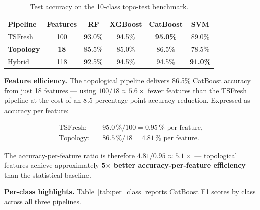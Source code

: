 \documentclass[12pt, a4paper]{article}
\theoremstyle{definition}
\theoremstyle{plain}
\begin{document}
\begin{table}[H]
\centering
\caption{Test accuracy on the 10-class topo-test benchmark.}
\label{tab:results_main}
\begin{tabular}{lccccc}
\toprule
\textbf{Pipeline} & \textbf{Features} & \textbf{RF} & \textbf{XGBoost}
  & \textbf{CatBoost} & \textbf{SVM} \\
\midrule
TSFresh           & 100 & 93.0\% & 94.5\% & \textbf{95.0\%} & 89.0\% \\
\textbf{Topology} & \textbf{18}  & 85.5\% & 85.0\% & 86.5\% & 78.5\% \\
Hybrid            & 118 & 92.5\% & 94.5\% & 94.5\% & \textbf{91.0\%} \\
\bottomrule
\end{tabular}
\end{table}

\noindent
\textbf{Feature efficiency.} The topological pipeline delivers 86.5\% CatBoost
accuracy from just 18 features — using $100/18 \approx 5.6\times$ fewer features
than the TSFresh pipeline at the cost of an 8.5 percentage point accuracy
reduction. Expressed as accuracy per feature:

\begin{align*}
  \text{TSFresh:} &\quad 95.0\,\% / 100 = 0.95\,\% \text{ per feature,} \\
  \text{Topology:} &\quad 86.5\,\% / 18  = 4.81\,\% \text{ per feature.}
\end{align*}

The accuracy-per-feature ratio is therefore
$4.81 / 0.95 \approx 5.1\times$ — topological features achieve
approximately \textbf{5$\times$ better accuracy-per-feature efficiency} than
the statistical baseline.

\medskip
\noindent
\textbf{Per-class highlights.}
Table~\ref{tab:per_class} reports CatBoost F1 scores by class across all three
pipelines.
\end{document}
